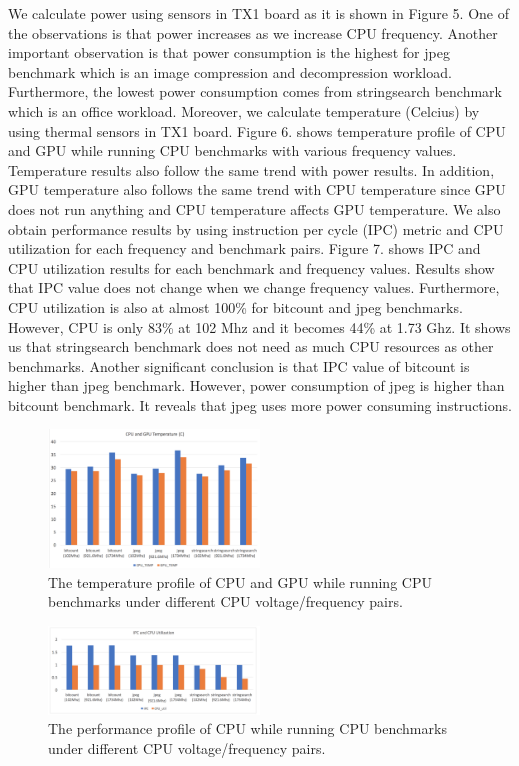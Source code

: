 We calculate power using sensors in TX1 board as it is shown in Figure 5. One of the observations is that power increases as we increase CPU frequency. Another important observation is that power consumption is the highest for jpeg benchmark which is an image compression and decompression workload. Furthermore, the lowest power consumption comes from stringsearch benchmark which is an office workload. 
Moreover, we calculate temperature (Celcius) by using thermal sensors in TX1 board. Figure 6. shows temperature profile of CPU and GPU while running CPU benchmarks with various frequency values. Temperature results also follow the same trend with power results. In addition, GPU temperature also follows the same trend with CPU temperature since GPU does not run anything and CPU temperature affects GPU temperature. 
We also obtain performance results by using instruction per cycle (IPC) metric and CPU utilization for each frequency and benchmark pairs. Figure 7. shows IPC and CPU utilization results for each benchmark and frequency values. Results show that IPC value does not change when we change frequency values. Furthermore, CPU utilization is also at almost 100\% for bitcount and jpeg benchmarks. However, CPU is only 83\% at 102 Mhz and it becomes 44\% at 1.73 Ghz. It shows us that stringsearch benchmark does not need as much CPU resources as other benchmarks. 
Another significant conclusion is that IPC value of bitcount is higher than jpeg benchmark. However, power consumption of jpeg is higher than bitcount benchmark. It reveals that jpeg uses more power consuming instructions.


\begin{figure}[h]
    \centering
    \includegraphics[width=0.5\textwidth]{cputemp.png}
    \caption{The temperature profile of CPU and GPU while running CPU benchmarks under different CPU voltage/frequency pairs.}\label{fig:cputemp}
\end{figure}


\begin{figure}[h]
    \centering
    \includegraphics[width=0.5\textwidth]{cpuipc.png}
    \caption{The performance profile of CPU while running CPU benchmarks under different CPU voltage/frequency pairs.}\label{fig:cpuperf}
\end{figure}